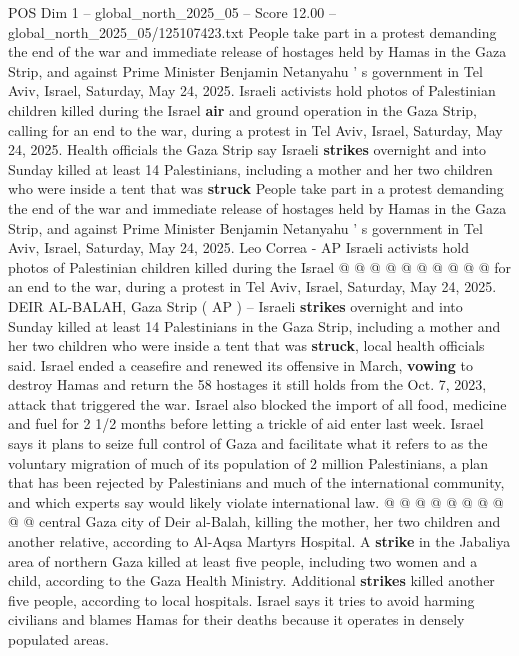 \begin{textsample}{POS Dim 1 – global\_north\_2025\_05 – Score 12.00 – global\_north\_2025\_05/125107423.txt}  \label{ex:f1_pos_380}
People take part in a protest demanding the end of the war and immediate release of hostages held by Hamas in the Gaza Strip, and against Prime Minister Benjamin Netanyahu ' s government in Tel Aviv, Israel, Saturday, May 24, 2025.
Israeli activists hold photos of Palestinian children killed during the Israel \textbf{air} and ground operation in the Gaza Strip, calling for an end to the war, during a protest in Tel Aviv, Israel, Saturday, May 24, 2025.
Health officials the Gaza Strip say Israeli \textbf{strikes} overnight and into Sunday killed at least 14 Palestinians, including a mother and her two children who were inside a tent that was \textbf{struck} People take part in a protest demanding the end of the war and immediate release of hostages held by Hamas in the Gaza Strip, and against Prime Minister Benjamin Netanyahu ' s government in Tel Aviv, Israel, Saturday, May 24, 2025.
Leo Correa - AP Israeli activists hold photos of Palestinian children killed during the Israel @ @ @ @ @ @ @ @ @ @ for an end to the war, during a protest in Tel Aviv, Israel, Saturday, May 24, 2025.
DEIR AL-BALAH, Gaza Strip ( AP ) -- Israeli \textbf{strikes} overnight and into Sunday killed at least 14 Palestinians in the Gaza Strip, including a mother and her two children who were inside a tent that was \textbf{struck}, local health officials said.
Israel ended a ceasefire and renewed its offensive in March, \textbf{vowing} to destroy Hamas and return the 58 hostages it still holds from the Oct. 7, 2023, attack that triggered the war.
Israel also blocked the import of all food, medicine and fuel for 2 1/2 months before letting a trickle of aid enter last week.
Israel says it plans to seize full control of Gaza and facilitate what it refers to as the voluntary migration of much of its population of 2 million Palestinians, a plan that has been rejected by Palestinians and much of the international community, and which experts say would likely violate international law. @ @ @ @ @ @ @ @ @ @ central Gaza city of Deir al-Balah, killing the mother, her two children and another relative, according to Al-Aqsa Martyrs Hospital.
A \textbf{strike} in the Jabaliya area of northern Gaza killed at least five people, including two women and a child, according to the Gaza Health Ministry.
Additional \textbf{strikes} killed another five people, according to local hospitals.
Israel says it tries to avoid harming civilians and blames Hamas for their deaths because it operates in densely populated areas.

\end{textsample}
